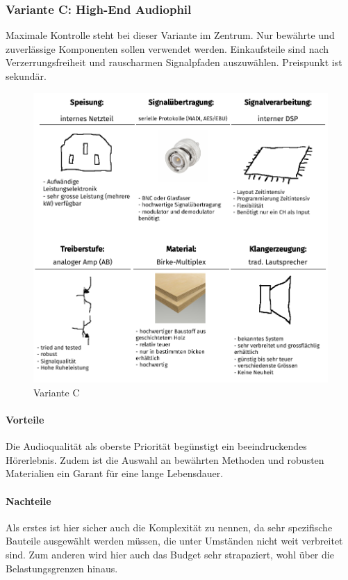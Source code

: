 \subsubsection{Variante C: High-End Audiophil}
Maximale Kontrolle steht bei dieser Variante im Zentrum. Nur bewährte und zuverlässige Komponenten sollen verwendet werden. Einkaufsteile sind nach Verzerrungsfreiheit und rauscharmen Signalpfaden auszuwählen. Preispunkt ist sekundär.
\begin{figure}[H]
	\centering
	\includegraphics{pictures/VarianteC_HighEndAudiophil.pdf}
	\caption{Variante C}
\end{figure}
\paragraph{Vorteile} Die Audioqualität als oberste Priorität begünstigt ein beeindruckendes Hörerlebnis. Zudem ist die Auswahl an bewährten Methoden und robusten Materialien ein Garant für eine lange Lebensdauer.
\paragraph{Nachteile} Als erstes ist hier sicher auch die Komplexität zu nennen, da sehr spezifische Bauteile ausgewählt werden müssen, die unter Umständen nicht weit verbreitet sind. Zum anderen wird hier auch das Budget sehr strapaziert, wohl über die Belastungsgrenzen hinaus.
\newpage
